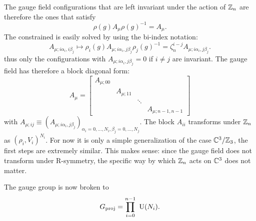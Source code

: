 \documentclass[a4paper,10pt]{article}
\begin{document}
        The gauge field configurations that are left invariant under the action of $\mathbb{Z}_n$ are therefore the ones that satisfy
        \begin{equation}
            \rho(g)A_\mu\rho(g)^{-1}=A_\mu.
        \end{equation}
        The constrained is easily solved by using the bi-index notation:
        \begin{equation}
            A_{\mu;i\alpha_i,i\beta_j}\mapsto \rho_i(g)A_{\mu;i\alpha_i,j\beta_j}\rho_j(g)^{-1}=\zeta^{i-j}_nA_{\mu;i\alpha_i,j\beta_j}.
        \end{equation}
        thus only the configurations with $A_{\mu;i\alpha_i,j\beta_j}=0$ if $i\neq j$ are invariant. The gauge field has therefore a block diagonal form:
        \begin{equation}
            A_\mu=
            \begin{bmatrix}
                A_{\mu;00} & & & \\
                & A_{\mu;11} & & \\
                & & \ddots & \\
                & & & A_{\mu;n-1,n-1}
            \end{bmatrix}
        \end{equation}
        with $A_{\mu;ij}\equiv (A_{\mu;i\alpha_i,j\beta_j})_{\alpha_i=0,\dots,N_i,\beta_j=0,\dots,N_j}$. The block $A_{ii}$ transforms under $\mathbb{Z}_n$ as $(\rho_i,V_i)^{N_i}$. For now it is only a simple generalization of the case $\mathbb{C}^3/\mathbb{Z}_3$, the first steps are extremely similar. This makes sense: since the gauge field does not transform under R-symmetry, the specific way by which $\mathbb{Z}_n$ acts on $\mathbb{C}^3$ does not matter.
        
        The gauge group is now broken to
        \begin{equation}
            G_{\text{proj}}=\prod^{n-1}_{i=0}~\text{U}(N_i).
        \end{equation}
\end{document}
